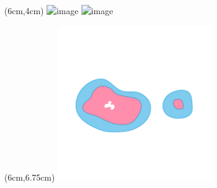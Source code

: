 \begin{frame}
  \begin{textblock*}{6cm}(6cm,4cm)
    \centering
    \includegraphics<1>[trim=50 250 50 300, clip, width=0.5\textwidth]{figures/ass1_2/PQ1comp}%
    \includegraphics<2>[trim=50 250 50 300, clip, width=0.5\textwidth]{figures/ass1_2/PQ1comp-spread}%
  \end{textblock*}
  \begin{textblock*}{6cm}(6cm,6.75cm)
    \centering
    \includegraphics[trim=50 250 50 300, clip, width=0.5\textwidth]{figures/ass1_2/PQ1}%
  \end{textblock*}

\end{frame}
